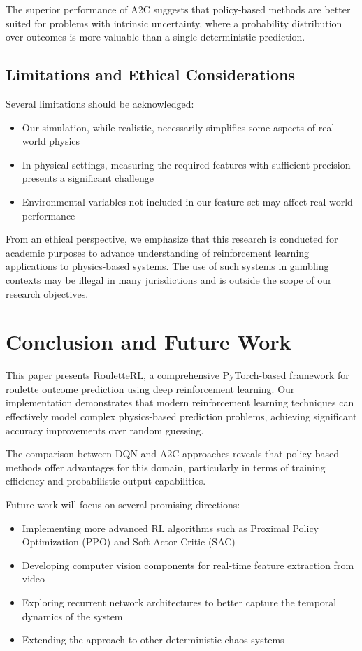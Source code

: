 \documentclass[conference]{IEEEtran}
\begin{document}
The superior performance of A2C suggests that policy-based methods are better suited for problems with intrinsic uncertainty, where a probability distribution over outcomes is more valuable than a single deterministic prediction.

\subsection{Limitations and Ethical Considerations}

Several limitations should be acknowledged:

\begin{itemize}
    \item Our simulation, while realistic, necessarily simplifies some aspects of real-world physics
    \item In physical settings, measuring the required features with sufficient precision presents a significant challenge
    \item Environmental variables not included in our feature set may affect real-world performance
\end{itemize}

From an ethical perspective, we emphasize that this research is conducted for academic purposes to advance understanding of reinforcement learning applications to physics-based systems. The use of such systems in gambling contexts may be illegal in many jurisdictions and is outside the scope of our research objectives.

\section{Conclusion and Future Work}

This paper presents RouletteRL, a comprehensive PyTorch-based framework for roulette outcome prediction using deep reinforcement learning. Our implementation demonstrates that modern reinforcement learning techniques can effectively model complex physics-based prediction problems, achieving significant accuracy improvements over random guessing.

The comparison between DQN and A2C approaches reveals that policy-based methods offer advantages for this domain, particularly in terms of training efficiency and probabilistic output capabilities.

Future work will focus on several promising directions:

\begin{itemize}
    \item Implementing more advanced RL algorithms such as Proximal Policy Optimization (PPO) and Soft Actor-Critic (SAC)
    \item Developing computer vision components for real-time feature extraction from video
    \item Exploring recurrent network architectures to better capture the temporal dynamics of the system
    \item Extending the approach to other deterministic chaos systems
\end{itemize}
\end{document}
